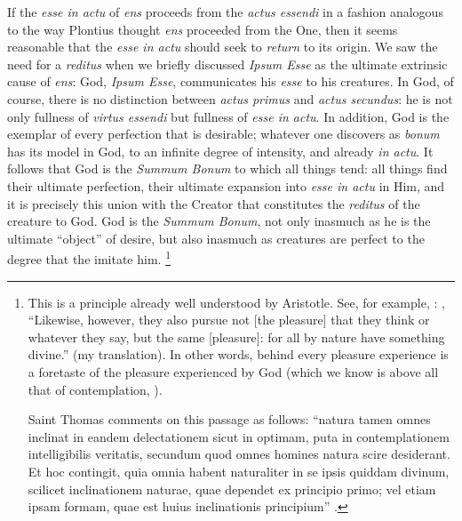 If the \emph{esse in actu} of \emph{ens} proceeds from the \emph{actus essendi} in a fashion analogous to the way Plontius thought \emph{ens} proceeded from the One, then it seems reasonable that the \emph{esse in actu} should seek to \emph{return} to its origin. We saw the need for a \emph{reditus} when we briefly discussed \emph{Ipsum Esse} as the ultimate extrinsic cause of \emph{ens}: God, \emph{Ipsum Esse}, communicates his \emph{esse} to his creatures. In God, of course, there is no distinction between \emph{actus primus} and \emph{actus secundus}: he is not only fullness of \emph{virtus essendi} but fullness of \emph{esse in actu}. In addition, God is the exemplar of every perfection that is desirable; whatever one discovers as \emph{bonum} has its model in God, to an infinite degree of intensity, and already \emph{in actu}. It follows that God is the \emph{Summum Bonum} to which all things tend: all things find their ultimate perfection, their ultimate expansion into \emph{esse in actu} in Him, and it is precisely this union with the Creator that constitutes the \emph{reditus} of the creature to God. God is the \emph{Summum Bonum}, not only inasmuch as he is the ultimate ``object'' of desire, but also inasmuch as creatures are perfect to the degree that the imitate him.%
%
\footnote{This is a principle already well understood by Aristotle. See, for example, \cite[, 13, 1153b31--32]{aristotle:ethics}: , ``Likewise, however, they also pursue not [the pleasure] that they think or whatever they say, but the same [pleasure]: for all by nature have something divine.'' (my translation). In other words, behind every pleasure experience is a foretaste of the pleasure experienced by God (which we know is above all that of contemplation, ).

Saint Thomas comments on this passage as follows: ``natura tamen omnes inclinat in eandem delectationem sicut in optimam, puta in contemplationem intelligibilis veritatis, secundum quod omnes homines natura scire desiderant. Et hoc contingit, quia omnia habent naturaliter in se ipsis quiddam divinum, scilicet inclinationem naturae, quae dependet ex principio primo; vel etiam ipsam formam, quae est huius inclinationis principium'' \parencite[lib.~7, l.~1, n. 14]{st:ethics}.}

